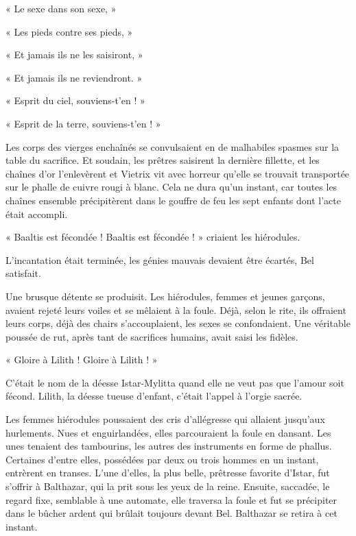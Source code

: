 \documentclass[a4paper, 11pt, oneside, polutonikogreek, french]{article}
\begin{document}
« Le sexe dans son sexe, »

« Les pieds contre ses pieds, »

« Et jamais ils ne les saisiront, »

« Et jamais ils ne reviendront. »

« Esprit du ciel, souviens-t'en ! »

« Esprit de la terre, souviens-t'en ! »

Les corps des vierges enchaînés se convulsaient en de malhabiles spasmes sur la table du sacrifice. Et soudain, les prêtres saisirent la dernière fillette, et les chaînes d'or l'enlevèrent et Vietrix vit avec horreur qu'elle se trouvait transportée sur le phalle de cuivre rougi à blanc. Cela ne dura qu'un instant, car toutes les chaînes ensemble précipitèrent dans le gouffre de feu les sept enfants dont l'acte était accompli.

« Baaltis est fécondée ! Baaltis est fécondée ! » criaient les hiérodules.

\bigskip
\centerline{\EightStarTaper}
\centerline{\EightStarTaper\EightStarTaper}
\bigskip

L'incantation était terminée, les génies mauvais devaient être écartés, Bel satisfait.

Une brusque détente se produisit. Les hiérodules, femmes et jeunes garçons, avaient rejeté leurs voiles et se mêlaient à la foule. Déjà, selon le rite, ils offraient leurs corps, déjà des chairs s'accouplaient, les sexes se confondaient. Une véritable poussée de rut, après tant de sacrifices humains, avait saisi les fidèles.

« Gloire à Lilith ! Gloire à Lilith ! »

C'était le nom de la déesse Istar-Mylitta quand elle ne veut pas que l'amour soit fécond. Lilith, la déesse tueuse d'enfant, c'était l'appel à l'orgie sacrée.

Les femmes hiérodules poussaient des cris d'allégresse qui allaient jusqu'aux hurlements. Nues et enguirlandées, elles parcouraient la foule en dansant. Les unes tenaient des tambourins, les autres des instruments en forme de phallus. Certaines d'entre elles, possédées par deux ou trois hommes en un instant, entrèrent en transes. L'une d'elles, la plus belle, prêtresse favorite d'Istar, fut s'offrir à Balthazar, qui la prit sous les yeux de la reine. Ensuite, saccadée, le regard fixe, semblable à une automate, elle traversa la foule et fut se précipiter dans le bûcher ardent qui brûlait toujours devant Bel. Balthazar se retira à cet instant.
\end{document}
